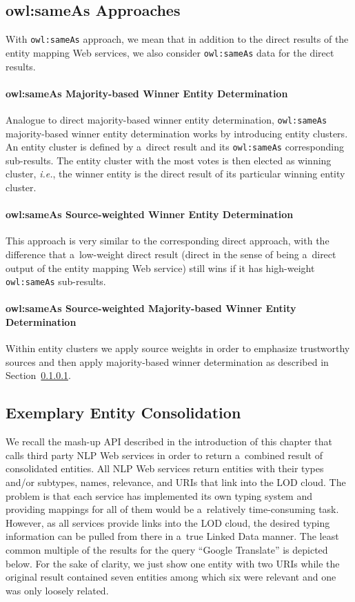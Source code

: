 \subsection{owl:sameAs Approaches}
With \texttt{owl:sameAs} approach, we mean that in addition to the direct results of the entity mapping Web services, we also
consider \texttt{owl:sameAs} data for the direct results.

\paragraph{owl:sameAs Majority-based Winner Entity Determination}\label{sec:owlsameas}
Analogue to direct majority-based winner entity determination, \texttt{owl:sameAs} majority-based winner entity
determination works by introducing entity clusters. An entity cluster is defined by a~direct result and its
\texttt{owl:sameAs} corresponding sub-results. The entity cluster with the most votes is then elected as winning
cluster, \emph{i.e.}, the winner entity is the direct result of its particular winning entity cluster.

\paragraph{owl:sameAs Source-weighted Winner Entity Determination}
This approach is very similar to the corresponding direct approach, with the difference that a~low-weight direct result
(direct in the sense of being a~direct output of the entity mapping Web service) still wins if it has high-weight
\texttt{owl:sameAs} sub-results.

\paragraph{owl:sameAs Source-weighted Majority-based Winner Entity Determination}
Within entity clusters we apply source weights in order to emphasize trustworthy sources and then apply
majority-based winner determination as described in Section~\ref{sec:owlsameas}.

\subsection{Exemplary Entity Consolidation}                     \label{sec:consolidation-nlp}
We recall the mash-up API described in the introduction of this chapter that calls third party NLP Web services in order to return a~combined result of consolidated entities.
All NLP Web services return entities with their types and/or subtypes, names,
relevance, and URIs that link into the LOD cloud. The problem is that each service has implemented its own typing
system and providing mappings for all of them would be a~relatively time-consuming task. However, as all services
provide links into the LOD cloud, the desired typing information can be pulled from there in a~true Linked Data manner. The least common
multiple of the results for the query ``Google Translate'' is depicted below. For the sake of clarity, we just show one
entity with two URIs while the original result contained seven entities among which six were relevant and one was only loosely related.

